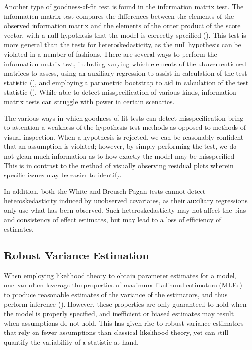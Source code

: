 \documentclass[12pt]{article} %
\theoremstyle{definition}
\begin{document}
		Another type of goodness-of-fit test is found in the information matrix test. The information matrix test compares the differences between the elements of the observed information matrix and the elements
		of the outer product of the score vector, with a null hypothesis that the model is correctly specified (\cite{White1982}). This test is more general than the tests for heteroskedasticity, as the null
		hypothesis can be violated in a number of fashions. There are several ways to perform the information matrix test, including varying which elements of the abovementioned matrices to assess, using an 
		auxiliary regression to assist in calculation of the test statistic (\cite{Chesher}), and employing a parametric bootstrap to aid in calculation of the test statistic (\cite{Dhaene}). While able to
		detect misspecification of various kinds, information matrix tests can struggle with power in certain scenarios.

		The various ways in which goodness-of-fit tests can detect misspecification bring to attention a weakness of the hypothesis test methods as opposed to methods of visual inspection.
		When a hypothesis is rejected, we can be reasonably confident that an assumption is violated; however, by simply performing the test, we do not glean much information as to how exactly the
		model may be misspecified. This is in contrast to the method of visually observing residual plots wherein specific issues may be easier to identify.

		In addition, both the White and Breusch-Pagan tests cannot detect heteroskedasticity induced by unobserved covariates, as their auxiliary regressions only use what has been observed. Such heteroskedasticity
		may not affect the bias and consistency of effect estimates, but may lead to a loss of efficiency of estimates. 

		\subsection*{Robust Variance Estimation}
	
		When employing likelihood theory to obtain parameter estimates for a model, one can often leverage the properties of maximum likelihood estimators (MLEs) to produce reasonable estimates of the variance of the
		estimators, and thus perform inference (\cite{Millar}). However, these properties are only guaranteed to hold when the model is properly specified, and inefficient or biased estimates may result when assumptions
		do not hold. This has given rise to robust variance estimators that rely on fewer assumptions than classical likelihood theory, yet can still quantify the variability of a statistic
		at hand.
\end{document}
